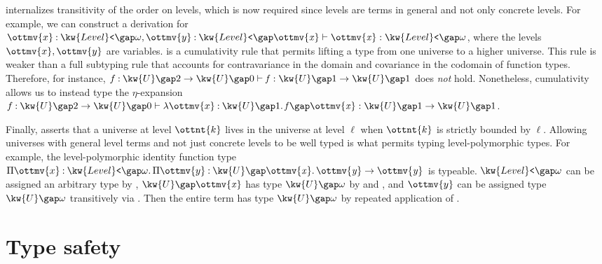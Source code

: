 \documentclass[a4paper,UKenglish,cleveref,autoref,thm-restate]{lipics-v2021}
\begin{document}
 internalizes transitivity of the order on levels,
which is now required since levels are terms in general and not only concrete levels.
For example, we can construct a derivation for $   \ottmv{x}  \mathbin{:}   \kw{Level}\texttt{<} \gap   \omega    ,  \ottmv{y}  \mathbin{:}   \kw{Level}\texttt{<} \gap   \mathit{ \ottmv{x} }     \vdash   \mathit{ \ottmv{x} }   \mathrel{:}   \kw{Level}\texttt{<} \gap   \omega   $,
where the levels $\ottmv{x}, \ottmv{y}$ are variables.
 is a cumulativity rule that permits lifting a type
from one universe to a higher universe.
This rule is weaker than a full subtyping rule that accounts for
contravariance in the domain and covariance in the codomain of function types.
Therefore, for instance, $  f  \mathbin{:}    \kw{U} \gap   2    \to   \kw{U} \gap   0      \vdash   \mathit{ f }   \mathrel{:}    \kw{U} \gap   1    \to   \kw{U} \gap   1    $ does \emph{not} hold.
Nonetheless, cumulativity allows us to instead type the $\eta$-expansion
$  f  \mathbin{:}    \kw{U} \gap   2    \to   \kw{U} \gap   0      \vdash    \lambda  \ottmv{x}  \mathbin{:}   \kw{U} \gap   1    \mathpunct{.}   \mathit{ f }    \gap   \mathit{ \ottmv{x} }    \mathrel{:}    \kw{U} \gap   1    \to   \kw{U} \gap   1    $.

Finally,  asserts that a universe at level $\ottnt{k}$
lives in the universe at level $\ell$ when $\ottnt{k}$ is strictly bounded by $\ell$.
Allowing universes with general level terms and not just concrete levels
to be well typed is what permits typing level-polymorphic types.
For example, the level-polymorphic identity function type
$ \Pi  \ottmv{x}  \mathbin{:}   \kw{Level}\texttt{<} \gap   \omega    \mathpunct{.}    \Pi  \ottmv{y}  \mathbin{:}   \kw{U} \gap   \mathit{ \ottmv{x} }    \mathpunct{.}   \mathit{ \ottmv{y} }    \to   \mathit{ \ottmv{y} }   $ is typeable.
$ \kw{Level}\texttt{<} \gap   \omega  $ can be assigned an arbitrary type by ,
$ \kw{U} \gap   \mathit{ \ottmv{x} }  $ has type $ \kw{U} \gap   \omega  $ by  and ,
and $\ottmv{y}$ can be assigned type $ \kw{U} \gap   \omega  $ transitively via .
Then the entire term has type $ \kw{U} \gap   \omega  $ by repeated application of .

\section{Type safety} \label{sec:safety}
\end{document}
